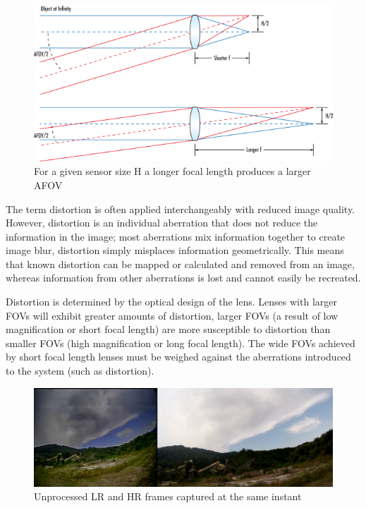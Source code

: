 \begin{figure}[h]
  \centering
  \includegraphics[scale=0.5]{figures/AFOV.png}
  \caption{For a given sensor size H a longer focal length produces a larger AFOV}
\end{figure}

The term distortion is often applied interchangeably with reduced image quality. However, distortion is an individual aberration that does not reduce the information in the image; most aberrations mix information together to create image blur, distortion simply misplaces information geometrically. This means that known distortion can be mapped or calculated and removed from an image, whereas information from other aberrations is lost and cannot easily be recreated.

Distortion is determined by the optical design of the lens. Lenses with larger FOVs will exhibit greater amounts of distortion, larger FOVs (a result of low magnification or short focal length) are more susceptible to distortion than smaller FOVs (high magnification or long focal length). The wide FOVs achieved by short focal length lenses must be weighed against the aberrations introduced to the system (such as distortion)\cite{distortion}.

\begin{figure}[h]
  \centering
  \includegraphics[scale=0.25]{figures/OG_sbs.png}
  \caption{Unprocessed LR and HR frames captured at the same instant}
  \label{img:og_sbs}
\end{figure}

